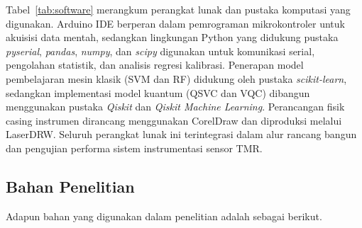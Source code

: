 Tabel~\ref{tab:software} merangkum perangkat lunak dan pustaka komputasi yang digunakan. Arduino IDE berperan dalam pemrograman mikrokontroler untuk akuisisi data mentah, sedangkan lingkungan Python yang didukung pustaka \textit{pyserial}, \textit{pandas}, \textit{numpy}, dan \textit{scipy} digunakan untuk komunikasi serial, pengolahan statistik, dan analisis regresi kalibrasi. Penerapan model pembelajaran mesin klasik (SVM dan RF) didukung oleh pustaka \textit{scikit-learn}, sedangkan implementasi model kuantum (QSVC dan VQC) dibangun menggunakan pustaka \textit{Qiskit} dan \textit{Qiskit Machine Learning}. Perancangan fisik casing instrumen dirancang menggunakan CorelDraw dan diproduksi melalui LaserDRW. Seluruh perangkat lunak ini terintegrasi dalam alur rancang bangun dan pengujian performa sistem instrumentasi sensor TMR.

\subsection{Bahan Penelitian}
Adapun bahan yang digunakan dalam penelitian adalah sebagai berikut.

